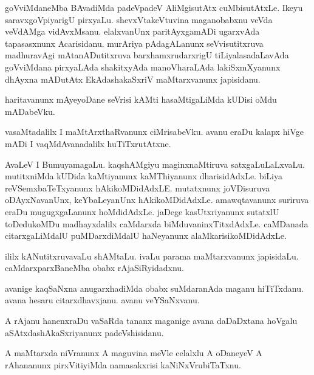 \documentclass{article}
\begin{document}
\begin{mn}%
goVviMdaneMba BAvadiMda padeVpadeV AliMgisutAtx cuMbisutAtxLe. Ikeyu saravxgoVpiyarigU 
pirxyaLu. shevxVtakeVtuvina maganobabxnu veVda veVdAMga vidAvxMsanu. elalxvanUnx 
paritAyxgamADi ugarxvAda tapasasxnunx Acarisidanu. murAriya pAdagALanunx seVvisutitxruva 
madhuravAgi mAtanADutitxruva barxhamxrudarxrigU tiLiyalasadaLavAda goVviMdana pirxyaLAda 
shakitxyAda manoVharaLAda lakiSxmXyanunx dhAyxna mADutAtx EkAdashakaSxriV maMtarxvanunx 
japisidanu.
\end{mn}

\begin{mn}%
haritavanunx mAyeyoDane seVrisi kAMti hasaMtigaLiMda kUDisi oMdu mADabeVku.
\end{mn}

\begin{mn}%
vasaMtadalilx I maMtArxthaRvanunx ciMrisabeVku. avanu eraDu kalapx hiVge mADi I 
vaqMdAvanadalilx huTiTxrutAtxne.
\end{mn}

\begin{mn}%
AvaLeV I BumuyamagaLu. kaqshAMgiyu maginxnaMtiruva satxgaLuLaLxvaLu. mutitxniMda kUDida 
kaMtiyanunx kaMThiyanunx dharisidAdxLe. biLiya reVSemxbaTeTxyanunx hAkikoMDidAdxLE. 
mutatxnunx joVDisuruva oDAyxNavanUnx, keYbaLeyanUnx hAkikoMDidAdxLe. amawqtavanunx 
suriruva eraDu mugugxgaLanunx hoMdidAdxLe. jaDege kasUtxriyanunx sutatxlU toDedukoMDu 
madhayxdalilx caMdarxda biMduvaninxTitxdAdxLe. caMDanada citarxgaLiMdalU puMDarxdiMdalU 
haNeyanunx alaMkarisikoMDidAdxLe.
\end{mn}

\begin{mn}%
ililx kANutitxruvavaLu shAMtaLu. ivaLu parama maMtarxvanunx japisidaLu. caMdarxparxBaneMba 
obabx rAjaSiRyidadxnu.
\end{mn}

\begin{mn}%
avanige kaqSaNxna anugarxhadiMda obabx suMdaranAda maganu hiTiTxdanu. avana hesaru 
citarxdhavxjanu. avanu veYSaNxvanu.
\end{mn}

\begin{mn}%
A rAjanu hanenxraDu vaSaRda tananx maganige avana daDaDxtana hoVgalu 
aSAtxdashAkaSxriyanunx padeVshisidanu.
\end{mn}

\begin{mn}%
A maMtarxda niVranunx A maguvina meVle celalxlu A oDaneyeV  A rAhananunx pirxVitiyiMda 
namasakxrisi kaNiNxVrubiTaTxnu.
\end{mn}
\end{document}
